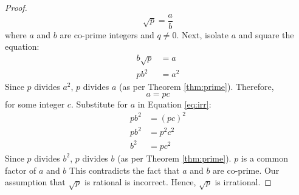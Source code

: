 \begin{outline}
\begin{proof}
        $$\sqrt{p} = \frac{a}{b}$$
        where $a$ and $b$ are co-prime integers and $q \ne 0$. Next, isolate $a$ and square the equation:
        \begin{align}
            b\sqrt{p} &= a \\
            pb^2 &= a^2 \label{eq:irr}
        \end{align}
        Since $p$ divides $a^2$, $p$ divides $a$ (as per Theorem \ref{thm:prime}). Therefore,
        $$a = pc$$
        for some integer $c$. Substitute for $a$ in Equation \ref{eq:irr}:
        \begin{align*}
            pb^2 &= (pc)^2 \\
            pb^2 &= p^2c^2 \\
            b^2 &= pc^2
        \end{align*}
        Since $p$ divides $b^2$, $p$ divides $b$ (as per Theorem \ref{thm:prime}). $p$ is a common factor of $a$ and $b$ This contradicts the fact that $a$ and $b$ are co-prime. Our assumption that $\sqrt{p}$ is rational is incorrect. Hence, $\sqrt{p}$ is irrational.
    \end{proof}
\end{outline}
